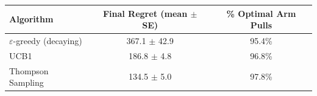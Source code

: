 \begin{tabular}{lcc}
\hline
Algorithm & Final Regret (mean $\pm$ SE) & \% Optimal Arm Pulls \\
\hline
$\varepsilon$-greedy (decaying) & 367.1 $\pm$ 42.9 & 95.4\% \\
UCB1 & 186.8 $\pm$ 4.8 & 96.8\% \\
Thompson Sampling & 134.5 $\pm$ 5.0 & 97.8\% \\
\hline
\end{tabular}